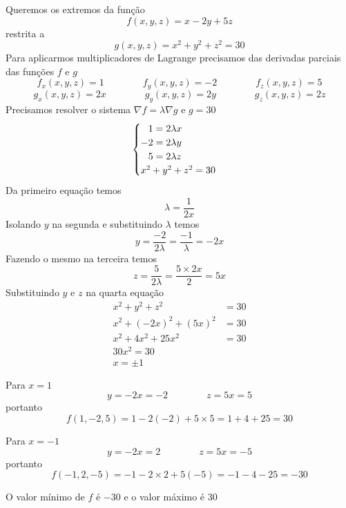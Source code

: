 \documentclass[a4paper,12pt,fleqn]{article}
\begin{document}
\begin{answer}
  Queremos os extremos da função
  \[
    f(x, y, z) = x - 2y + 5z
  \]
  restrita a
  \[
    g(x, y, z) = x^2 + y^2 + z^2 = 30
  \]
  Para aplicarmos multiplicadores de Lagrange precisamos das derivadas parciais
  das funções $f$ e $g$
  \[
    f_x(x, y, z) =  1 \qquad\qquad
    f_y(x, y, z) = -2 \qquad\qquad
    f_z(x, y, z) =  5
  \]
  \[
    g_x(x, y, z) = 2x \qquad\qquad
    g_y(x, y, z) = 2y \qquad\qquad
    g_z(x, y, z) = 2z
  \]
  Precisamos resolver o sistema \(\nabla f = \lambda \nabla g\) e \(g=30\)
  \[
    \begin{cases}
       \hphantom{-}1 = 2\lambda x \\
      -2 = 2\lambda y \\
       \hphantom{-}5 = 2\lambda z \\
       x^2 + y^2 + z^2 = 30
    \end{cases}
  \]
  Da primeiro equação temos
  \[
    \lambda = \frac{1}{2x}
  \]
  Isolando $y$ na segunda e substituindo $\lambda$ temos
  \[
    y
    = \frac{-2}{2\lambda}
    = \frac{-1}{\lambda}
    = -2x
  \]
  Fazendo o mesmo na terceira temos
  \[
    z
    = \frac{5}{2\lambda}
    = \frac{5\times 2x}{2}
    = 5x
  \]
  Substituindo $y$ e $z$ na quarta equação
  \begin{align*}
    x^2 + y^2 + z^2        & = 30 \\
    x^2 + (-2x)^2 + (5x)^2 & = 30 \\
    x^2 + 4x^2 + 25x^2     & = 30 \\
    30 x^2 = 30            &  \\
    x = \pm 1              &
  \end{align*}

  Para $x=1$
  \[
    y = -2x = -2 \qquad\qquad
    z = 5x = 5
  \]
  portanto
  \[
    f(1, -2, 5)
    = 1 - 2(-2) + 5\times 5
    = 1 + 4 + 25
    = 30
  \]

  Para $x=-1$
  \[
    y = -2x = 2 \qquad\qquad
    z = 5x = -5
  \]
  portanto
  \[
  f(-1, 2, -5)
    = -1 - 2\times 2 + 5(-5)
    = -1 - 4 - 25
    = -30
  \]

  O valor mínimo de $f$ é $-30$ e o valor máximo é $30$
\end{answer}

\end{document}
